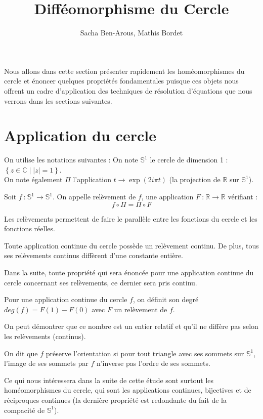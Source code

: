 \documentclass[11pt,a4paper]{article}
\title{\textbf{Difféomorphisme du Cercle}}
\date{}
\author{Sacha Ben-Arous, Mathis Bordet}
\begin{document}
\maketitle
Nous allons dans cette section présenter rapidement les homéomorphismes du cercle et énoncer quelques propriétés fondamentales puisque ces objets nous offrent un cadre d'application des techniques de résolution d'équations que nous verrons dans les sections suivantes.
\section{Application du cercle}
On utilise les notations suivantes :
On note $\mathbb{S}^1$ le cercle de dimension 1 : $\left\{ z \in \mathbb{C} \mid |z|=1 \right\}$.
\\
On note également $\Pi$ l'application $ t \to \exp (2i\pi t) $ (la projection de $\mathbb{R}$ sur $\mathbb{S}^1$).
\begin{defin}
Soit $f \ \text{:} \ \mathbb{S}^1 \to \mathbb{S}^1$. On appelle relèvement de $f$, une application $F \ \text{:} \ \mathbb{R} \to \mathbb{R}$ vérifiant :
\begin{equation*}
f \circ \Pi = \Pi \circ F
\end{equation*}
\end{defin}
\begin{rmq}
Les relèvements permettent de faire le parallèle entre les fonctions du cercle et les fonctions réelles.
\end{rmq}
\begin{thm}
Toute application continue du cercle possède un relèvement continu. De plus, tous ses relèvements continus diffèrent d'une constante entière.
\end{thm}
Dans la suite, toute propriété qui sera énoncée pour une application continue du cercle concernant ses relèvements, ce dernier sera pris continu.
\begin{defin}
Pour une application continue du cercle $f$, on définit son degré $deg(f)= F(1)-F(0)$ avec $F$ un relèvement de $f$.
\end{defin}
\begin{rmq}
On peut démontrer que ce nombre est un entier relatif et qu'il ne diffère pas selon les relèvements (continus).
\end{rmq}
\begin{defin}
On dit que $f$ préserve l'orientation si pour tout triangle avec ses sommets sur $\mathbb{S}^1$, l'image de ses sommets par $f$ n'inverse pas l'ordre de ses sommets.
\end{defin}
Ce qui nous intéressera dans la suite de cette étude sont surtout les homéomorphismes du cercle, qui sont les applications continues, bijectives et de réciproques continues (la dernière propriété est redondante du fait de la compacité de $\mathbb{S}^1$).
\end{document}
